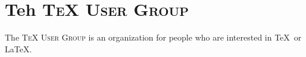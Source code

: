 \documentclass{article}
\newcommand{\TUG}{\textsc{TeX User Group}\xspace}
\begin{document}
\section{Teh \TUG}
The \TUG is an organization for people who are interested in \TeX\ or \LaTeX.
\end{document}

